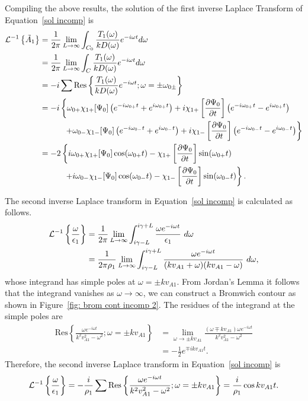 \documentclass[12pt]{../style-files/ociamthesis}
\begin{document}
Compiling the above results, the solution of the first inverse Laplace Transform of Equation~\eqref{sol incomp} is
\begin{align}
\mathcal{L}^{-1}\left\{ \tilde{A}_1 \right\} &= \frac{1}{2\pi} \lim_{L \to \infty} \int_{C_0} \frac{T_1(\omega)}{kD(\omega)} e^{-i\omega t} d\omega \\
&= \frac{1}{2\pi} \lim_{L \to \infty} \int_{C} \frac{T_1(\omega)}{kD(\omega)} e^{-i\omega t} d\omega \notag \\
&= -i \sum \mathrm{Res}\left\{\frac{T_1(\omega)}{kD(\omega)}e^{-i\omega t}; \omega = \pm \omega_{0\pm} \right\} \notag \\
&= -i \left\{\omega_{0+}\chi_{1+}[\Psi_0] \left(e^{-i\omega_{0+} t} + e^{i\omega_{0+} t}\right) + i\chi_{1+}\left[ \frac{\partial \Psi_0}{\partial t} \right] \left(e^{-i\omega_{0+} t} - e^{i\omega_{0+} t}\right) \right. \notag \\
& \qquad\quad \left. + \omega_{0-}\chi_{1-}[\Psi_0] \left(e^{-i\omega_{0-} t} + e^{i\omega_{0-} t}\right) + i\chi_{1-}\left[ \frac{\partial \Psi_0}{\partial t} \right] \left(e^{-i\omega_{0-} t} - e^{i\omega_{0-} t}\right)\right\} \notag \\
&= -2 \left\{ i\omega_{0+}\chi_{1+}[\Psi_0] \cos(\omega_{0+} t) - \chi_{1+}\left[ \frac{\partial \Psi_0}{\partial t} \right] \sin(\omega_{0+} t) \right. \notag \\
& \qquad\quad \left. + i\omega_{0-}\chi_{1-}[\Psi_0] \cos(\omega_{0-} t) - \chi_{1-}\left[ \frac{\partial \Psi_0}{\partial t} \right] \sin(\omega_{0-} t) \right\}.
\end{align}


The second inverse Laplace transform in Equation~\eqref{sol incomp} is calculated as follows.
\begin{align}
\mathcal{L}^{-1}\left\{ \frac{\omega}{\epsilon_1} \right\} &= \frac{1}{2\pi}\lim_{L \to \infty} \int_{i\gamma - L}^{i\gamma + L} \frac{\omega e^{-i\omega t}}{\epsilon_1} ~d\omega \notag \\
&= \frac{1}{2\pi\rho_1}\lim_{L \to \infty} \int_{i\gamma - L}^{i\gamma + L} \frac{\omega e^{-i\omega t}}{(kv_{A1} + \omega)(kv_{A1} - \omega)} ~d\omega,
\end{align}
whose integrand has simple poles at $\omega = \pm k v_{A1}$. From Jordan's Lemma it follows that the integrand vanishes as $\omega \to \infty$, we can construct a Bromwich contour as shown in Figure~\ref{fig: brom cont incomp 2}. The residues of the integrand at the simple poles are
\begin{align}
\mathrm{Res}\left\{\frac{\omega e^{-i\omega t}}{k^2v_{A1}^2 - \omega^2}; \omega = \pm kv_{A1} \right\} &= 
\lim_{\omega \to \pm kv_{A1}} \frac{(\omega \mp kv_{A1}) \omega e^{-i\omega t}}{k^2v_{A1}^2 - \omega^2} \\ 
&= -\frac{1}{2}e^{\mp ikv_{A1} t}.
\end{align}
Therefore, the second inverse Laplace transform in Equation~\eqref{sol incomp} is
\begin{equation}
\mathcal{L}^{-1}\left\{ \frac{\omega}{\epsilon_1} \right\} = -\frac{i}{\rho_1} \sum \mathrm{Res} \left\{ \frac{\omega e^{-i\omega t}}{k^2v_{A1}^2 - \omega^2}; \omega = \pm kv_{A1} \right\} = \frac{i}{\rho_1}\cos{kv_{A1}t}.
\end{equation}
\end{document}
